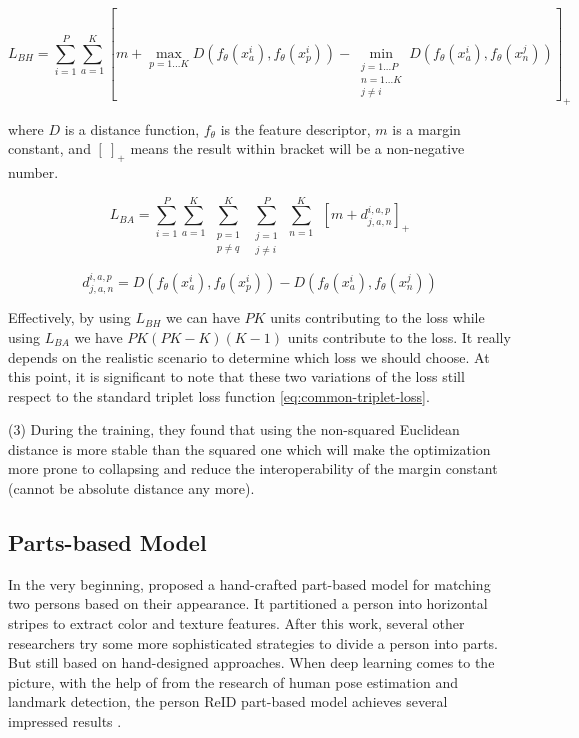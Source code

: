 \begin{equation}
\label{eq:batch-hard}
     L_{BH} = \sum_{i=1}^{P} \sum_{a=1}^{K}
            [
                m + \max_{p=1...K} D(f_{\theta}(x_{a}^i), f_{\theta}(x_{p}^i))
                - \min_{\substack{j=1...P\\ n=1...K\\ j\neq i}}
                D(f_{\theta}(x_{a}^i), f_{\theta}(x_{n}^j))
            ]_+
\end{equation}

\noindent where $D$ is a distance function, $f_\theta$ is the feature 
descriptor, $m$ is a margin constant, and $[\:]_+$ means the result within 
bracket will be a non-negative number.

\begin{equation}
\label{eq:batch-all}
    L_{BA} = \sum_{i=1}^{P} \sum_{a=1}^{K}  \:
             \sum_{\substack{p=1\\ p\neq q}}^{K} \:
             \sum_{\substack{j=1\\ j \neq i}}^{P} \:
             \sum_{n=1}^{K} \:\:
             [m + d_{j, a, n}^{i, a, p}]_+
\end{equation}

$$d_{j, a, n}^{i, a, p} =  D(f_{\theta}(x_{a}^i), f_{\theta}(x_{p}^i)) - D(f_{\theta}(x_{a}^i), f_{\theta}(x_{n}^j))$$

Effectively, by using $L_{BH}$ we can have $PK$ units contributing to the loss 
while using $L_{BA}$ we have $PK(PK - K)(K - 1)$ units
contribute to the loss. It really depends on the realistic scenario to 
determine which loss we should choose. At this point, it is
significant to note that these two variations of the loss still respect to the 
standard triplet loss function \autoref{eq:common-triplet-loss}.

\noindent 
(3) During the training, they found that using the non-squared Euclidean 
distance is more stable than the squared one which will make the
optimization more prone to collapsing and reduce the interoperability of the 
margin constant (cannot be absolute distance any more).

\subsection{Parts-based Model}

In the very beginning, \cite{hand-crafted-part-based} proposed a hand-crafted
part-based model for matching two persons based on their appearance.
It partitioned a person into horizontal stripes to extract color and texture 
features. After this work, several other researchers \cite{part-based-triangle,
part-based-pictorial-structure} try some more sophisticated strategies to 
divide a person into parts. But still based on hand-designed approaches. 
When deep learning comes to the picture, with the help of from the
research of human pose estimation and landmark detection, the person ReID 
part-based model achieves several impressed results \cite{deep-part-based-glad, 
pose-driven-dcnn-for-reid, pose-invariant-embedding-for-reid}.

